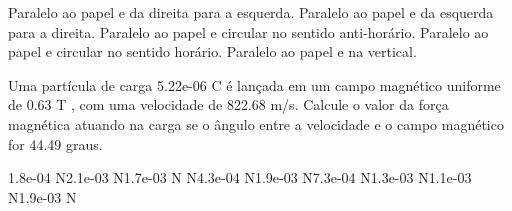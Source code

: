 \documentclass[12pt, addpoints]{exam}
\begin{document}
\begin{questions}
\begin{multicols*}{2}
\begin{choices}
\choice Paralelo ao papel e da direita para a esquerda. 
\choice Paralelo ao papel e da esquerda para a direita. 
\choice Paralelo ao papel e circular no sentido anti-horário. 
\choice Paralelo ao papel e circular no sentido horário. 
\choice Paralelo ao papel e na vertical. 
\end{choices}
\question Uma partícula de carga 5.22e-06 C é lançada em um campo magnético uniforme de    0.63 T , com uma velocidade de 822.68 m/s. Calcule o valor da força magnética atuando na carga se o ângulo entre a velocidade e o campo magnético for   44.49 graus.

\begin{oneparchoices}
\choice 1.8e-04 N\choice 2.1e-03 N\choice 1.7e-03 N N\choice 4.3e-04 N\choice 1.9e-03 N\choice 7.3e-04 N\choice 1.3e-03 N\choice 1.1e-03 N\choice 1.9e-03 N
\end{oneparchoices}\end{multicols*}
\end{questions}
\newpage
\end{document}
